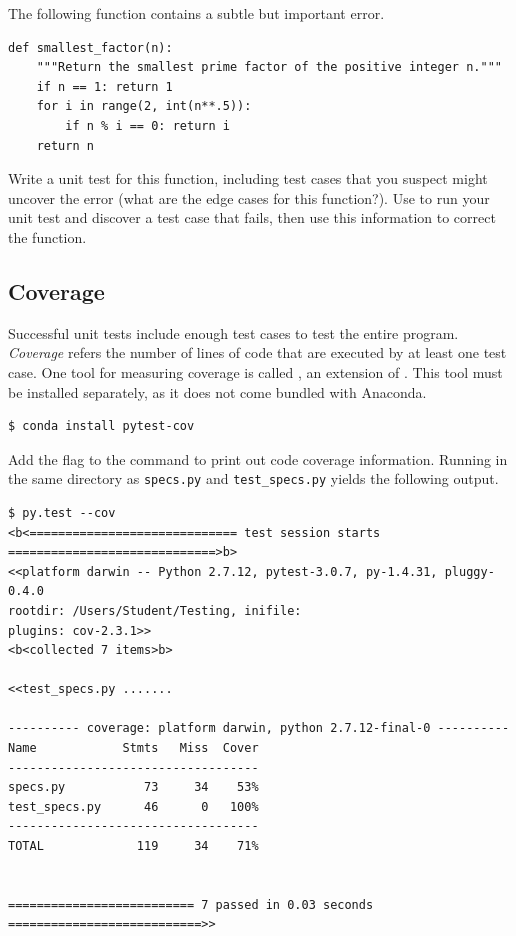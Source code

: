 \begin{problem} %
The following function contains a subtle but important error.
\begin{lstlisting}
def smallest_factor(n):
    """Return the smallest prime factor of the positive integer n."""
    if n == 1: return 1
    for i in range(2, int(n**.5)):
        if n % i == 0: return i
    return n
\end{lstlisting}
Write a unit test for this function, including test cases that you suspect might uncover the error (what are the edge cases for this function?).
Use  to run your unit test and discover a test case that fails, then use this information to correct the function.
\label{prob:unittest_intro}
\end{problem}

\subsection*{Coverage} %

Successful unit tests include enough test cases to test the entire program.
\emph{Coverage} refers the number of lines of code that are executed by at least one test case.
One tool for measuring coverage is called , an extension of .
This tool must be installed separately, as it does not come bundled with Anaconda.

\begin{lstlisting}[language=bash]
$ conda install pytest-cov
\end{lstlisting}

Add the flag  to the  command to print out code coverage information.
Running  in the same directory as \texttt{specs.py} and \texttt{test\_specs.py} yields the following output.

\begin{lstlisting}
$ py.test --cov
<b<============================= test session starts =============================>b>
<<platform darwin -- Python 2.7.12, pytest-3.0.7, py-1.4.31, pluggy-0.4.0
rootdir: /Users/Student/Testing, inifile:
plugins: cov-2.3.1>>
<b<collected 7 items>b>

<<test_specs.py .......

---------- coverage: platform darwin, python 2.7.12-final-0 ----------
Name            Stmts   Miss  Cover
-----------------------------------
specs.py           73     34    53%
test_specs.py      46      0   100%
-----------------------------------
TOTAL             119     34    71%


========================== 7 passed in 0.03 seconds ===========================>>\end{lstlisting}

